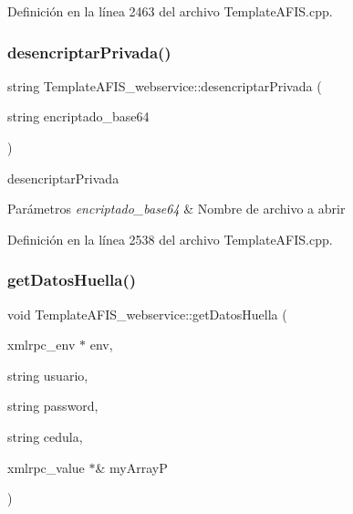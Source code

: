 Definición en la línea 2463 del archivo Template\+A\+F\+I\+S.\+cpp.

\hypertarget{classTemplateAFIS__webservice_a4da03ee6cb795586858c4a09f3cdc789}{}\label{classTemplateAFIS__webservice_a4da03ee6cb795586858c4a09f3cdc789} 
\subsubsection{\texorpdfstring{desencriptar\+Privada()}{desencriptarPrivada()}}
{\footnotesize\ttfamily string Template\+A\+F\+I\+S\+\_\+webservice\+::desencriptar\+Privada (\begin{DoxyParamCaption}\item[{string}]{encriptado\+\_\+base64 }\end{DoxyParamCaption})}



desencriptar\+Privada 


\begin{DoxyParams}{Parámetros}
{\em encriptado\+\_\+base64} & Nombre de archivo a abrir \\
\hline
\end{DoxyParams}


Definición en la línea 2538 del archivo Template\+A\+F\+I\+S.\+cpp.

\hypertarget{classTemplateAFIS__webservice_aeb75c2999e3b58cbf800b9f9ffea082c}{}\label{classTemplateAFIS__webservice_aeb75c2999e3b58cbf800b9f9ffea082c} 
\subsubsection{\texorpdfstring{get\+Datos\+Huella()}{getDatosHuella()}}
{\footnotesize\ttfamily void Template\+A\+F\+I\+S\+\_\+webservice\+::get\+Datos\+Huella (\begin{DoxyParamCaption}\item[{xmlrpc\+\_\+env $\ast$}]{env,  }\item[{string}]{usuario,  }\item[{string}]{password,  }\item[{string}]{cedula,  }\item[{xmlrpc\+\_\+value $\ast$\&}]{my\+ArrayP }\end{DoxyParamCaption})}



